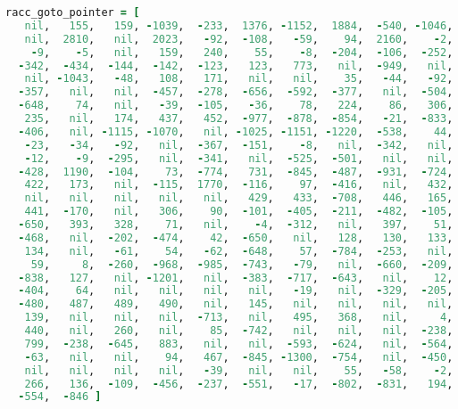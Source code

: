 \begin{lstlisting}[language=Ruby, style=rubystyle]
racc_goto_pointer = [
   nil,   155,   159, -1039,  -233,  1376, -1152,  1884,  -540, -1046,
   nil,  2810,   nil,  2023,   -92,  -108,   -59,    94,  2160,    -2,
    -9,    -5,   nil,   159,   240,    55,    -8,  -204,  -106,  -252,
  -342,  -434,  -144,  -142,  -123,   123,   773,   nil,  -949,   nil,
   nil, -1043,   -48,   108,   171,   nil,   nil,    35,   -44,   -92,
  -357,   nil,   nil,  -457,  -278,  -656,  -592,  -377,   nil,  -504,
  -648,    74,   nil,   -39,  -105,   -36,    78,   224,    86,   306,
   235,   nil,   174,   437,   452,  -977,  -878,  -854,   -21,  -833,
  -406,   nil, -1115, -1070,   nil, -1025, -1151, -1220,  -538,    44,
   -23,   -34,   -92,   nil,  -367,  -151,    -8,   nil,  -342,   nil,
   -12,    -9,  -295,   nil,  -341,   nil,  -525,  -501,   nil,   nil,
  -428,  1190,  -104,    73,  -774,   731,  -845,  -487,  -931,  -724,
   422,   173,   nil,  -115,  1770,  -116,    97,  -416,   nil,   432,
   nil,   nil,   nil,   nil,   nil,   429,   433,  -708,   446,   165,
   441,  -170,   nil,   306,    90,  -101,  -405,  -211,  -482,  -105,
  -650,   393,   328,    71,   nil,    -4,  -312,   nil,   397,    51,
  -468,   nil,  -202,  -474,    42,  -650,   nil,   128,   130,   133,
   134,   nil,   -61,    54,   -62,  -648,    57,  -784,  -253,   nil,
    59,     8,  -260,  -968,  -985,  -743,   -79,   nil,  -660,  -209,
  -838,   127,   nil, -1201,   nil,  -383,  -717,  -643,   nil,    12,
  -404,    64,   nil,   nil,   nil,   nil,   -19,   nil,  -329,  -205,
  -480,   487,   489,   490,   nil,   145,   nil,   nil,   nil,   nil,
   139,   nil,   nil,   nil,  -713,   nil,   495,   368,   nil,     4,
   440,   nil,   260,   nil,    85,  -742,   nil,   nil,   nil,  -238,
   799,  -238,  -645,   883,   nil,   nil,  -593,  -624,   nil,  -564,
   -63,   nil,   nil,    94,   467,  -845, -1300,  -754,   nil,  -450,
   nil,   nil,   nil,   nil,   -39,   nil,   nil,    55,   -58,    -2,
   266,   136,  -109,  -456,  -237,  -551,   -17,  -802,  -831,   194,
  -554,  -846 ]


\end{lstlisting}
